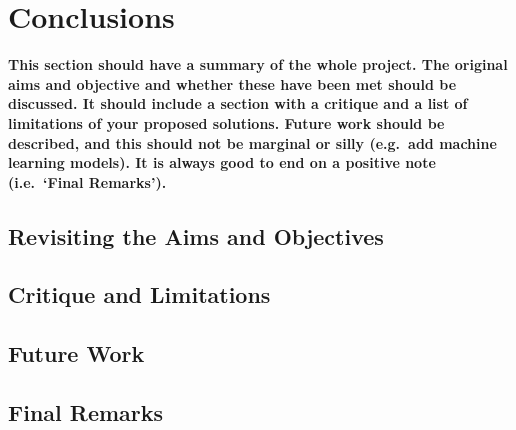 \chapter{Conclusions}
\textbf{This section should have a summary of the whole project.  The original aims and objective and whether these have been met should be discussed. It should include a section with a critique and a list of limitations of your proposed solutions.  Future work should be described, and this should not be marginal or silly (e.g.\ add machine learning models).  It is always good to end on a positive note (i.e.\ `Final Remarks').}

\section{Revisiting the Aims and Objectives}
\blindtext

\section{Critique and Limitations}
\blindtext

\section{Future Work}
\blindtext

\section{Final Remarks}
\blindtext
